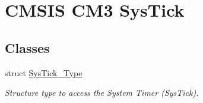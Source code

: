 \hypertarget{group___c_m_s_i_s___c_m3___sys_tick}{\section{C\-M\-S\-I\-S C\-M3 Sys\-Tick}
\label{group___c_m_s_i_s___c_m3___sys_tick}
}
\subsection*{Classes}
\begin{DoxyCompactItemize}
\item 
struct \hyperlink{struct_sys_tick___type}{Sys\-Tick\-\_\-\-Type}
\begin{DoxyCompactList}\small\item\em Structure type to access the System Timer (Sys\-Tick). \end{DoxyCompactList}\end{DoxyCompactItemize}
